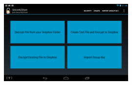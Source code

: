 \begin{figure}[h!]
    \centering
    \includegraphics[width=0.6\textwidth]{main}                                                                                                                                                                                                                                                                                                                                                                                                                                                                                                                                                                                                                                                                                                                                                                                                                                                                                                                                                                                                                                                                                                                                                                                                                                                                                                                                                                                                                                                                                                                                                                                                                                                                                                                                                                                                                                                                                                                                                                                                                                                                                                                                                                                                                                                                                                                                                                                                                                                                                                                                                                                                                                                                                                                                                                 
\end{figure}
